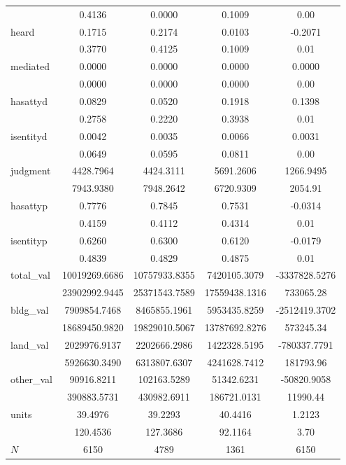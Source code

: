 {\begin{tabular}{l*{4}{c}}
            &     0.4136 &     0.0000 &     0.1009 &        0.00\\
heard       &     0.1715 &     0.2174 &     0.0103 &     -0.2071\\
            &     0.3770 &     0.4125 &     0.1009 &        0.01\\
mediated    &     0.0000 &     0.0000 &     0.0000 &      0.0000\\
            &     0.0000 &     0.0000 &     0.0000 &        0.00\\
hasattyd    &     0.0829 &     0.0520 &     0.1918 &      0.1398\\
            &     0.2758 &     0.2220 &     0.3938 &        0.01\\
isentityd   &     0.0042 &     0.0035 &     0.0066 &      0.0031\\
            &     0.0649 &     0.0595 &     0.0811 &        0.00\\
judgment    &  4428.7964 &  4424.3111 &  5691.2606 &   1266.9495\\
            &  7943.9380 &  7948.2642 &  6720.9309 &     2054.91\\
hasattyp    &     0.7776 &     0.7845 &     0.7531 &     -0.0314\\
            &     0.4159 &     0.4112 &     0.4314 &        0.01\\
isentityp   &     0.6260 &     0.6300 &     0.6120 &     -0.0179\\
            &     0.4839 &     0.4829 &     0.4875 &        0.01\\
total\_val   &10019269.6686 &10757933.8355 &7420105.3079 & -3337828.5276\\
            &23902992.9445 &25371543.7589 &17559438.1316 &   733065.28\\
bldg\_val    &7909854.7468 &8465855.1961 &5953435.8259 & -2512419.3702\\
            &18689450.9820 &19829010.5067 &13787692.8276 &   573245.34\\
land\_val    &2029976.9137 &2202666.2986 &1422328.5195 & -780337.7791\\
            &5926630.3490 &6313807.6307 &4241628.7412 &   181793.96\\
other\_val   & 90916.8211 &102163.5289 & 51342.6231 & -50820.9058\\
            &390883.5731 &430982.6911 &186721.0131 &    11990.44\\
units       &    39.4976 &    39.2293 &    40.4416 &      1.2123\\
            &   120.4536 &   127.3686 &    92.1164 &        3.70\\
\hline
\(N\)       &        6150&        4789&        1361&        6150\\
\hline\hline
\end{tabular}
}
